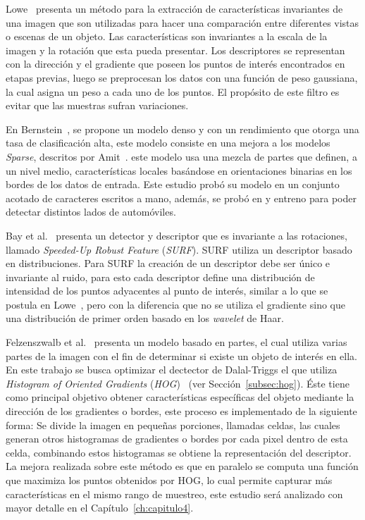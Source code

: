 Lowe~\cite{sift2004} presenta un método para la extracción de características invariantes de una imagen que son utilizadas para hacer una comparación entre diferentes vistas o escenas de un objeto. Las características son invariantes a la escala de la imagen y la rotación que esta pueda presentar. Los descriptores se representan con la dirección y el gradiente que poseen los puntos de interés encontrados en etapas previas, luego se preprocesan los datos con una función de peso gaussiana, la cual asigna un peso a cada uno de los puntos. El propósito de este filtro es evitar que las muestras sufran variaciones.

En Bernstein~\cite{statistical2005}, se propone un modelo denso y con un rendimiento que otorga una tasa de clasificación alta, este modelo consiste en una mejora a los modelos \textit{Sparse}, descritos por Amit~\cite{Amit2002}. este modelo usa una mezcla de partes que definen, a un nivel medio, características locales basándose en orientaciones binarias en los bordes de los datos de entrada. Este estudio probó su modelo en un conjunto acotado de caracteres escritos a mano, además, se probó en y entreno para poder detectar distintos lados de automóviles.

Bay et al.~\cite{surf2008} presenta un detector y descriptor que es invariante a las rotaciones, llamado \textit{Speeded-Up Robust Feature} (\textit{SURF}). SURF utiliza un descriptor basado en distribuciones. Para SURF la creación de un descriptor debe ser único e invariante al ruido, para esto cada descriptor define una distribución de intensidad de los puntos adyacentes al punto de interés, similar a lo que se postula en Lowe~\cite{sift2004}, pero con la diferencia que no se utiliza el gradiente sino que una distribución de primer orden basado en los \textit{wavelet} de Haar.

Felzenszwalb et al.~\cite{Felzenszwalb2010} presenta un modelo basado en partes,  el cual utiliza varias partes de la imagen con el fin de determinar si existe un objeto de interés en ella. En este trabajo se busca optimizar el dectector de Dalal-Triggs el que utiliza \textit{Histogram of Oriented Gradients} (\textit{HOG})~\cite{hog2005} (ver Sección~\ref{subsec:hog}). Éste tiene como principal objetivo obtener características específicas del objeto mediante la dirección de los gradientes o bordes, este proceso es implementado de la siguiente forma: Se divide la imagen en pequeñas porciones, llamadas celdas, las cuales generan otros histogramas de gradientes o bordes por cada pixel dentro de esta celda, combinando estos histogramas se obtiene la representación del descriptor. La mejora realizada sobre este método es que en paralelo se computa una función que maximiza los puntos obtenidos por HOG, lo cual permite capturar más características en el mismo rango de muestreo, este estudio será analizado con mayor detalle en el Capítulo~\ref{ch:capitulo4}.

